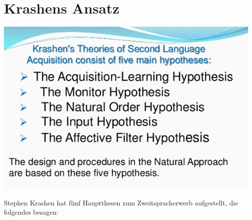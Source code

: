 \documentclass[
  letterpaper,
]{scrbook}
\begin{document}
\hypertarget{krashens-ansatz}{%
\section{Krashens Ansatz}\label{krashens-ansatz}}

\includegraphics[width=1\textwidth,height=\textheight]{./pictures/krashens_5_hypotheses.png}

Stephen Krashen hat fünf Hauptthesen zum Zweitspracherwerb aufgestellt,
die folgendes besagen:
\end{document}
